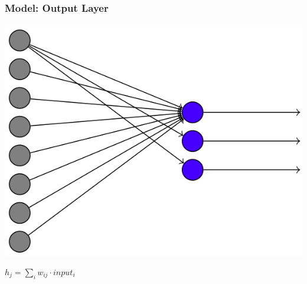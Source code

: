 \begin{frame}
\frametitle{Model: Output Layer}
\begin{multicols}{2}
\begin{center}
\includegraphics[scale=.1]{pics/model_output}
\end{center}
\columnbreak
\begin{center}
$h_j = \sum_i w_{ij} \cdot input_i$
\end{center}
\end{multicols}
\end{frame}

